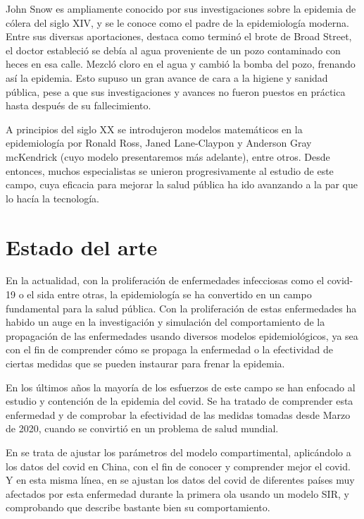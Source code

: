 John Snow es ampliamente conocido por sus investigaciones sobre la epidemia de cólera del siglo XIV, y se le conoce como el padre de la epidemiología moderna. Entre sus diversas aportaciones, destaca como terminó el brote de Broad Street, el doctor estableció se debía al agua proveniente de un pozo contaminado con heces en esa calle. Mezcló cloro en el agua y cambió la bomba del pozo, frenando así la epidemia. Esto supuso un gran avance de cara a la higiene y sanidad pública, pese a que sus investigaciones y avances no fueron puestos en práctica hasta después de su fallecimiento.

A principios del siglo XX se introdujeron modelos matemáticos en la epidemiología por Ronald Ross, Janed Lane-Claypon y Anderson Gray mcKendrick (cuyo modelo presentaremos más adelante), entre otros. Desde entonces, muchos especialistas se unieron progresivamente al estudio de este campo, cuya eficacia para mejorar la salud pública ha ido avanzando a la par que lo hacía la tecnología.

\section{Estado del arte}

En la actualidad, con la proliferación de enfermedades infecciosas como el covid-19 o el sida entre otras, la epidemiología se ha convertido en un campo fundamental para la salud pública. Con la proliferación de estas enfermedades ha habido un auge en la investigación y simulación del comportamiento de la propagación de las enfermedades usando diversos modelos epidemiológicos, ya sea con el fin de comprender cómo se propaga la enfermedad o la efectividad de ciertas medidas que se pueden instaurar para frenar la epidemia.

En los últimos años la mayoría de los esfuerzos de este campo se han enfocado al estudio y contención de la epidemia del covid. Se ha tratado de comprender esta enfermedad y de comprobar la efectividad de las medidas tomadas desde Marzo de 2020, cuando se convirtió en un problema de salud mundial.

En \cite{demongeotSIEpidemicModel} se trata de ajustar los parámetros del modelo compartimental, aplicándolo a los datos del covid en China, con el fin de conocer y comprender mejor el covid. Y en esta misma línea, en \cite{enrique_amaro} se ajustan los datos del covid de diferentes países muy afectados por esta enfermedad durante la primera ola usando un modelo SIR, y comprobando que describe bastante bien su comportamiento.

